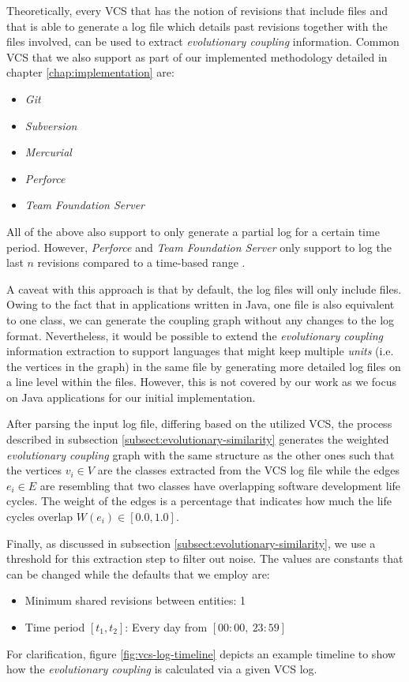 \documentclass[12pt,a4paper]{report}
\begin{document}
Theoretically, every VCS that has the notion of revisions that include files
and that is able to generate a log file which details past revisions together
with the files involved, can be used to extract \textit{evolutionary coupling}
information. Common VCS that we also support as part of our implemented
methodology detailed in chapter \ref{chap:implementation} are:
\begin{itemize}[noitemsep]
  \item \textit{Git}
  \item \textit{Subversion}
  \item \textit{Mercurial}
  \item \textit{Perforce}
  \item \textit{Team Foundation Server}
\end{itemize}
All of the above also support to only generate a partial log for a certain
time period. However, \textit{Perforce} and \textit{Team Foundation Server}
only support to log the last \(n\) revisions compared to a time\hyp based range
\cite{perforce, team-foundation-server}.

A caveat with this approach is that by default, the log files will only
include files. Owing to the fact that in applications written in Java,
one file is also equivalent to one class, we can generate the coupling graph
without any changes to the log format. Nevertheless, it would be possible
to extend the \textit{evolutionary coupling} information extraction to support
languages that might keep multiple \textit{units} (i.e. the vertices in the graph)
in the same file by generating more detailed log files on a line level within
the files. However, this is not covered by our work as we focus on
Java applications for our initial implementation.

After parsing the input log file, differing based on the utilized VCS,
the process described in subsection \ref{subsect:evolutionary-similarity}
generates the weighted \textit{evolutionary coupling} graph with the same
structure as the other ones such that the vertices \(v_i \in V\) are the classes
extracted from the VCS log file while the edges \(e_i \in E\) are resembling
that two classes have overlapping software development life cycles.
The weight of the edges is a percentage that indicates how much the
life cycles overlap \(W(e_i) \in [0.0, 1.0]\).

Finally, as discussed in subsection \ref{subsect:evolutionary-similarity},
we use a threshold for this extraction step to filter out noise.
The values are constants that can be changed while the defaults that we employ are:
\begin{itemize}[noitemsep]
  \item Minimum shared revisions between entities: 1
  \item Time period \([t_1, t_2]\): Every day from \([00:00, \ 23:59]\)
\end{itemize}
For clarification, figure \ref{fig:vcs-log-timeline} depicts an example
timeline to show how the \textit{evolutionary coupling} is calculated
via a given VCS log.
\end{document}
